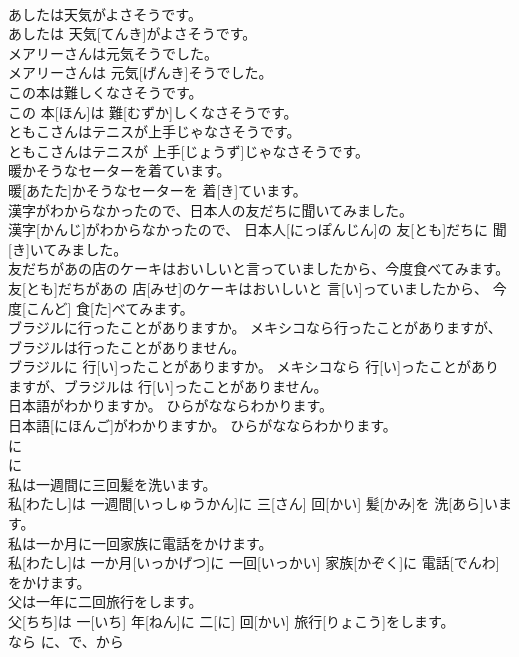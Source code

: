 \documentclass[8pt]{extreport}
\begin{document}
\begin{CJK}{UTF8}{min}
\\	あしたは天気がよさそうです。	
\\	あしたは 天気[てんき]がよさそうです。	
\\	メアリーさんは元気そうでした。	
\\	メアリーさんは 元気[げんき]そうでした。	
\\	この本は難しくなさそうです。	
\\	この 本[ほん]は 難[むずか]しくなさそうです。	
\\	ともこさんはテニスが上手じゃなさそうです。	
\\	ともこさんはテニスが 上手[じょうず]じゃなさそうです。	
\\	暖かそうなセーターを着ています。	
\\	暖[あたた]かそうなセーターを 着[き]ています。	
\\	漢字がわからなかったので、日本人の友だちに聞いてみました。	
\\	漢字[かんじ]がわからなかったので、 日本人[にっぽんじん]の 友[とも]だちに 聞[き]いてみました。	
\\	友だちがあの店のケーキはおいしいと言っていましたから、今度食べてみます。	
\\	友[とも]だちがあの 店[みせ]のケーキはおいしいと 言[い]っていましたから、 今度[こんど] 食[た]べてみます。	
\\	ブラジルに行ったことがありますか。 メキシコなら行ったことがありますが、ブラジルは行ったことがありません。	
\\	ブラジルに 行[い]ったことがありますか。 メキシコなら 行[い]ったことがありますが、ブラジルは 行[い]ったことがありません。	
\\	日本語がわかりますか。 ひらがなならわかります。	
\\	日本語[にほんご]がわかりますか。 ひらがなならわかります。	
\\	に 
\\	に 
\\	私は一週間に三回髪を洗います。	
\\	私[わたし]は 一週間[いっしゅうかん]に 三[さん] 回[かい] 髪[かみ]を 洗[あら]います。	
\\	私は一か月に一回家族に電話をかけます。	
\\	私[わたし]は 一か月[いっかげつ]に 一回[いっかい] 家族[かぞく]に 電話[でんわ]をかけます。	
\\	父は一年に二回旅行をします。	
\\	父[ちち]は 一[いち] 年[ねん]に 二[に] 回[かい] 旅行[りょこう]をします。	
\\	なら に、で、から 

\end{CJK}
\end{document}

